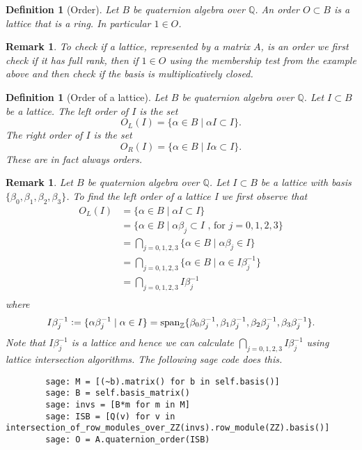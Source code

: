 \documentclass[10pt]{article}
\theoremstyle{plain}
\newtheorem{remark}[theorem]{Remark}
\newtheorem{definition}[theorem]{Definition}
\theoremstyle{definition}
\newcommand{\op}{\operatorname}
\newcommand{\Z}{\mathbb{Z}}
\newcommand{\Q}{\mathbb{Q}}
\begin{document}
\begin{definition}[Order]
    Let \( B \) be quaternion algebra over \( \Q \).
    An \emph{order} \( O \subset B \) is a lattice that is a ring.
    In particular \( 1 \in O \).
\end{definition}

\begin{remark}
    To check if a lattice, represented by a matrix \( A \), is an order we first check if it has full rank, then if \( 1 \in O \) using the membership test from the example above and then check if the basis is multiplicatively closed.
\end{remark}

\begin{definition}[Order of a lattice]
    Let \( B \) be quaternion algebra over \( \Q \).
    Let \( I \subset B  \) be a lattice.
    The \emph{left order} of \( I \) is the set
    \[
        O_L(I) = \{\alpha \in B \mid \alpha I \subset I\}.
    \]
    The \emph{right order} of \( I \) is the set
    \[
        O_R(I) = \{ \alpha \in B \mid I \alpha \subset I \}.
    \]
    These are in fact always orders.
\end{definition}

\begin{remark}
    Let \( B \) be quaternion algebra over \( \Q \).
    Let \( I \subset B  \) be a lattice with basis \( \{ \beta_0, \beta_1, \beta_2, \beta_3 \} \).
    To find the left order of a lattice I we first observe that
    \begin{align*}
        O_L(I)
          & = \{ \alpha \in B \mid \alpha I \subset I \}                                    \\
          & = \{ \alpha \in B \mid \alpha \beta_j \subset I \text{ , for } j = 0, 1, 2, 3\} \\
          & = \bigcap_{j = 0, 1, 2, 3} \{ \alpha \in B \mid \alpha \beta_j  \in I \}        \\
          & = \bigcap_{j = 0, 1, 2, 3} \{ \alpha \in B \mid \alpha  \in I\beta_j^{-1} \}    \\
          & = \bigcap_{j = 0, 1, 2, 3} I\beta_j^{-1}                                        \\
    \end{align*}
    where
    \[
        I\beta_j^{-1}
        \vcentcolon = \{\alpha \beta_j^{-1} \mid \alpha \in I \}
        = \op{span}_\Z\{\beta_0\beta_j^{-1}, \beta_1\beta_j^{-1}, \beta_2\beta_j^{-1}, \beta_3\beta_j^{-1} \}.
    \]
    Note that \( I\beta_j^{-1} \) is a lattice and hence we can calculate \( \bigcap_{j = 0, 1, 2, 3} I\beta_j^{-1}  \) using lattice intersection algorithms.
    The following sage code does this.
    \begin{lstlisting}
        sage: M = [(~b).matrix() for b in self.basis()]
        sage: B = self.basis_matrix()
        sage: invs = [B*m for m in M]
        sage: ISB = [Q(v) for v in intersection_of_row_modules_over_ZZ(invs).row_module(ZZ).basis()]
        sage: O = A.quaternion_order(ISB)
  \end{lstlisting}
\end{remark}
\end{document}
